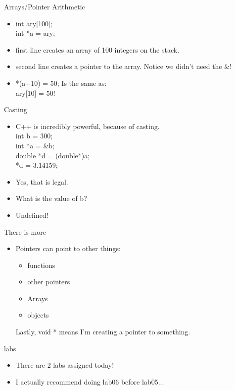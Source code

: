 \documentclass{beamer}
\begin{document}
\begin{frame}{Arrays/Pointer Arithmetic}
\begin{itemize}
\item int ary[100];\\
int *a = ary;
\item first line creates an array of 100 integers on the stack.
\item second line creates a pointer to the array.  Notice we didn't need the \&!
\item *(a+10) = 50; Is the same as:\\
ary[10] = 50!
\end{itemize}
\end{frame}

\begin{frame}{Casting}
\begin{itemize}
\item C++ is incredibly powerful, because of casting.\\
int b = 300; \\
int *a = \&b; \\
double *d = (double*)a; \\
*d = 3.14159;
\item Yes, that is legal. 
\item What is the value of b?
\item <2-> Undefined!
\end{itemize}
\end{frame}

\begin{frame}{There is more}
\begin{itemize}
\item Pointers can point to other things:
\begin{itemize}
\item functions
\item other pointers
\item Arrays
\item objects
\end{itemize}
Lastly, void * means I'm creating a pointer to something.
\end{itemize}
\end{frame}

\begin{frame}{labs}
\begin{itemize}
\item There are 2 labs assigned today!
\item I actually recommend doing lab06 before lab05...
\end{itemize}
\end{frame}
\end{document}
